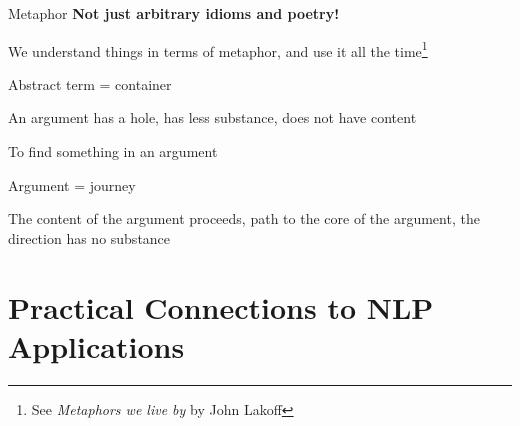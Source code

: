 \documentclass[aspectratio=169,cramped]{beamer}
\let\tempone\itemize
\let\temptwo\enditemize
\renewenvironment{itemize}{\tempone\addtolength{\itemsep}{-0\baselineskip}\addtolength{\parskip}{-0.2\baselineskip}}{\temptwo}
\newcommand{\ex}[1]{{\color{teal} #1}}
\begin{document}
\begin{frame}{Metaphor}
	\textbf{Not just arbitrary idioms and poetry!}
\begin{itemize}
  \item We understand things in terms of metaphor, and use it all the time\footnote{See
      \textit{Metaphors we live by} by John Lakoff}
  \item Abstract term = container
    \begin{itemize}
    \item \ex{An argument has a hole, has less substance, does not have content}
    \item \ex{To find something in an argument}
    \end{itemize}
  \item Argument = journey
    \begin{itemize}
    \item \ex{The content of the argument proceeds, path to the core of the argument, the direction
        has no substance}
    \end{itemize}

  \end{itemize}
\end{frame}


\section{Practical Connections to NLP Applications}

\end{document}
